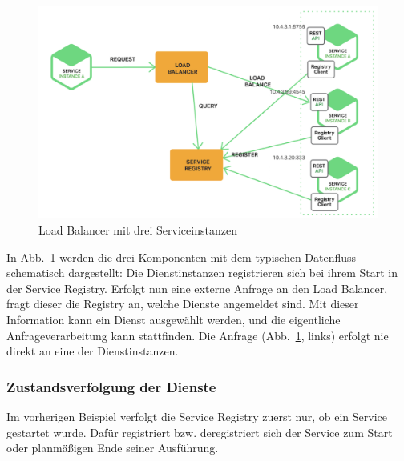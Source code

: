 \begin{figure}[t]
  \centering
  \includegraphics[width=\linewidth]{../images/loadbalancer.png}
  \caption{Load Balancer mit drei Serviceinstanzen~\cite{schoner2017analyse}}
    \label{fig:loadbalancer}
\end{figure}

In Abb.~\ref{fig:loadbalancer} werden die drei Komponenten mit dem typischen Datenfluss schematisch dargestellt:
Die Dienstinstanzen registrieren sich bei ihrem Start in der Service Registry.
Erfolgt nun eine externe Anfrage an den Load Balancer, fragt dieser die Registry an, welche Dienste angemeldet sind.
Mit dieser Information kann ein Dienst ausgewählt werden, und die eigentliche Anfrageverarbeitung kann stattfinden.
Die Anfrage (Abb.~\ref{fig:loadbalancer}, links) erfolgt nie direkt an eine der Dienstinstanzen.
\subsubsection{Zustandsverfolgung der Dienste}
Im vorherigen Beispiel verfolgt die Service Registry zuerst nur, ob ein Service gestartet wurde.
Dafür registriert bzw. deregistriert sich der Service zum Start oder planmäßigen Ende seiner Ausführung.

